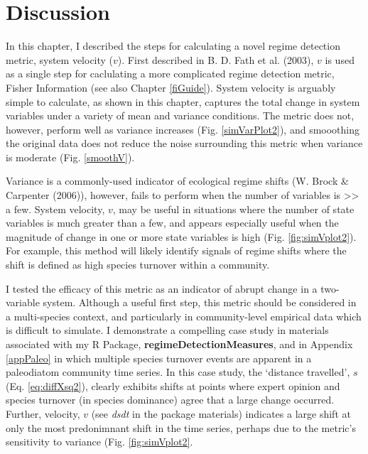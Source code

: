 \documentclass[12pt,twoside,openany]{reedthesis}
\begin{document}
\section{Discussion}\label{discussion-2}

In this chapter, I described the steps for calculating a novel regime
detection metric, system velocity (\(v\)). First described in B. D. Fath
et al. (2003), \(v\) is used as a single step for caclulating a more
complicated regime detection metric, Fisher Information (see also
Chapter \ref{fiGuide}). System velocity is arguably simple to calculate,
as shown in this chapter, captures the total change in system variables
under a variety of mean and variance conditions. The metric does not,
however, perform well as variance increases (Fig. \ref{simVarPlot2}),
and smooothing the original data does not reduce the noise surrounding
this metric when variance is moderate (Fig. \ref{smoothV}).

Variance is a commonly-used indicator of ecological regime shifts (W.
Brock \& Carpenter (2006)), however, fails to perform when the number of
variables is \textgreater{}\textgreater{} a few. System velocity, \(v\),
may be useful in situations where the number of state variables is much
greater than a few, and appears especially useful when the magnitude of
change in one or more state variables is high (Fig.
\ref{fig:simVplot2}). For example, this method will likely identify
signals of regime shifts where the shift is defined as high species
turnover within a community.

I tested the efficacy of this metric as an indicator of abrupt change in
a two-variable system. Although a useful first step, this metric should
be considered in a multi-species context, and particularly in
community-level empirical data which is difficult to simulate. I
demonstrate a compelling case study in materials associated with my R
Package, \textbf{regimeDetectionMeasures}, and in Appendix
\ref{appPaleo} in which multiple species turnover events are apparent in
a paleodiatom community time series. In this case study, the `distance
travelled', \(s\) (Eq. \eqref{eq:diffXsq2}), clearly exhibits shifts at
points where expert opinion and species turnover (in species dominance)
agree that a large change occurred. Further, velocity, \(v\) (see
\emph{dsdt} in the package materials) indicates a large shift at only
the most predonimnant shift in the time series, perhaps due to the
metric's sensitivity to variance (Fig. \ref{fig:simVplot2}.
\end{document}

